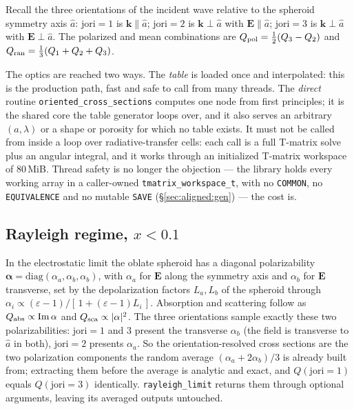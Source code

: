 \documentclass{my_memo}
\newcommand{\code}[1]{\texttt{#1}}
\begin{document}
Recall the three orientations of the incident wave relative to the spheroid
symmetry axis $\hat a$: $\mathrm{jori}=1$ is $\mathbf{k}\parallel\hat a$;
$\mathrm{jori}=2$ is $\mathbf{k}\perp\hat a$ with $\mathbf{E}\parallel\hat a$;
$\mathrm{jori}=3$ is $\mathbf{k}\perp\hat a$ with $\mathbf{E}\perp\hat a$. The
polarized and mean combinations are
$Q_{\rm pol}=\tfrac12(Q_3-Q_2)$ and $Q_{\rm ran}=\tfrac13(Q_1+Q_2+Q_3)$.

The optics are reached two ways. The \emph{table} is loaded once and
interpolated: this is the production path, fast and safe to call from many
threads. The \emph{direct} routine \code{oriented\_cross\_sections} computes one
node from first principles; it is the shared core the table generator loops
over, and it also serves an arbitrary $(a,\lambda)$ or a shape or porosity for
which no table exists. It must not be called from inside a loop over
radiative-transfer cells: each call is a full T-matrix solve plus an angular
integral, and it works through an initialized T-matrix workspace of 80\,MiB.
Thread safety is no longer the objection --- the library holds every working
array in a caller-owned \code{tmatrix\_workspace\_t}, with no \code{COMMON}, no
\code{EQUIVALENCE} and no mutable \code{SAVE} (\S\ref{sec:aligned:gen}) --- the
cost is.

\subsection{Rayleigh regime, $x<0.1$}

In the electrostatic limit the oblate spheroid has a diagonal polarizability
$\boldsymbol\alpha=\mathrm{diag}(\alpha_a,\alpha_b,\alpha_b)$, with $\alpha_a$
for $\mathbf{E}$ along the symmetry axis and $\alpha_b$ for $\mathbf{E}$
transverse, set by the depolarization factors $L_a,L_b$ of the spheroid through
$\alpha_i\propto(\varepsilon-1)/[\,1+(\varepsilon-1)L_i\,]$. Absorption and
scattering follow as $Q_{\rm abs}\propto\mathrm{Im}\,\alpha$ and
$Q_{\rm sca}\propto|\alpha|^2$. The three orientations sample exactly these two
polarizabilities: $\mathrm{jori}=1$ and $3$ present the transverse $\alpha_b$
(the field is transverse to $\hat a$ in both), $\mathrm{jori}=2$ presents
$\alpha_a$. So the orientation-resolved cross sections are the two polarization
components the random average $(\alpha_a+2\alpha_b)/3$ is already built from;
extracting them before the average is analytic and exact, and $Q(\mathrm{jori}=1)$
equals $Q(\mathrm{jori}=3)$ identically. \code{rayleigh\_limit} returns them
through optional arguments, leaving its averaged outputs untouched.
\end{document}
